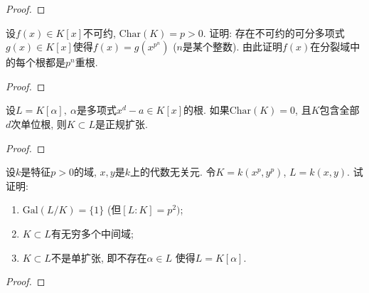 \begin{proof}
    
\end{proof}

\begin{problem}
    设$f(x) \in K[x]$不可约, $\mathrm{Char}(K) = p > 0$.
证明: 存在不可约的可分多项式$g(x) \in K[x]$使得$f(x) = g(x^{p^n})$
($n$是某个整数). 由此证明$f(x)$在分裂域中的每个根都是$p^n$重根.
\end{problem}

\begin{proof}
    
\end{proof}

\begin{problem}
    设$L = K[\alpha],~\alpha$是多项式$x^d - a \in K[x]$的根.
如果$\mathrm{Char}(K) = 0$,
且$K$包含全部$d$次单位根, 则$K \subset L$是正规扩张.
\end{problem}

\begin{proof}
    
\end{proof}

\begin{problem}
    设$k$是特征$p > 0$的域, $x, y$是$k$上的代数无关元.
令$K = k(x^p, y^p)$, $L = k(x, y)$. 试证明: 
\begin{enumerate}[(1)]
    \item $\mathrm{Gal}(L/K) = \{1\}$ (但$[L:K] = p^2)$;
    \item $K \subset L$有无穷多个中间域;
    \item $K \subset L$不是单扩张, 即不存在$\alpha \in L$
使得$L = K[\alpha]$.
\end{enumerate}
\end{problem}

\begin{proof}
    
\end{proof}